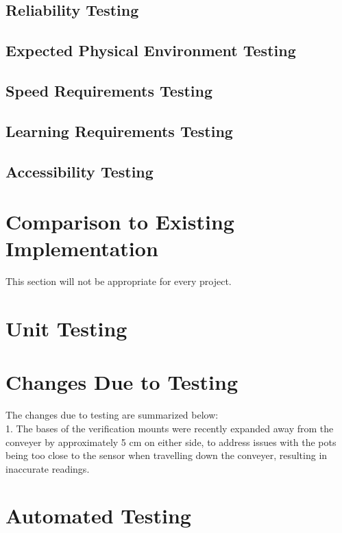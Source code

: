 \documentclass[12pt, titlepage]{article}
\begin{document}
\subsection{Reliability Testing}

\subsection{Expected Physical Environment Testing}

\subsection{Speed Requirements Testing}

\subsection{Learning Requirements Testing}

\subsection{Accessibility Testing}
	
\section{Comparison to Existing Implementation}	

This section will not be appropriate for every project.

\section{Unit Testing}

\section{Changes Due to Testing}

The changes due to testing are summarized below:
\\
1. The bases of the verification mounts were recently expanded away from the
conveyer by approximately 5 cm on either side, to address issues with the pots being too close to the sensor when travelling down the conveyer, resulting in inaccurate readings.

\section{Automated Testing}
		
\end{document}
